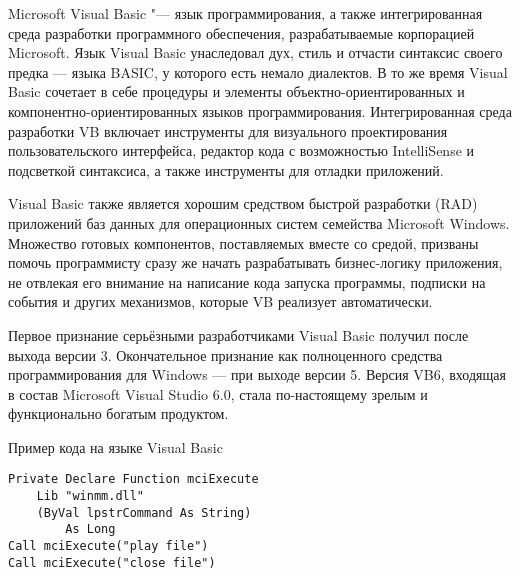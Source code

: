 \documentclass[14pt]{beamer}
\begin{document}
\begin{frame}[label=VisualBasic, shrink=10]
\begin{block}{Microsoft Visual Basic "---}
язык программирования, а также интегрированная среда разработки программного обеспечения, разрабатываемые корпорацией Microsoft. Язык Visual Basic унаследовал дух, стиль и отчасти синтаксис своего предка — языка BASIC, у которого есть немало диалектов. В то же время Visual Basic сочетает в себе процедуры и элементы объектно-ориентированных и компонентно-ориентированных языков программирования. 
Интегрированная среда разработки VB включает инструменты для визуального проектирования пользовательского интерфейса, редактор кода с возможностью IntelliSense и подсветкой синтаксиса, а также инструменты для отладки приложений.
\end{block}
\end{frame}

\begin{frame}
\begin{block}

Visual Basic также является хорошим средством быстрой разработки (RAD) приложений баз данных для операционных систем семейства Microsoft Windows. Множество готовых компонентов, поставляемых вместе со средой, призваны помочь программисту сразу же начать разрабатывать бизнес-логику приложения, не отвлекая его внимание на написание кода запуска программы, подписки на события и других механизмов, которые VB реализует автоматически.
\end{block}
\end{frame}

\begin{frame}
\begin{block}

Первое признание серьёзными разработчиками Visual Basic получил после выхода версии 3. Окончательное признание как полноценного средства программирования для Windows — при выходе версии 5. Версия VB6, входящая в состав Microsoft Visual Studio 6.0, стала по-настоящему зрелым и функционально богатым продуктом.
\end{block}
\end{frame}



\begin{frame}[fragile]{Пример кода на языке Visual Basic}
\begin{block}

\begin{lstlisting}
Private Declare Function mciExecute 
    Lib "winmm.dll"
    (ByVal lpstrCommand As String)
        As Long
Call mciExecute("play file")
Call mciExecute("close file")
\end{lstlisting}

\end{block}

\begin{center}
\hyperlink{menu}{}
\end{center}




\end{frame}
\end{document}
